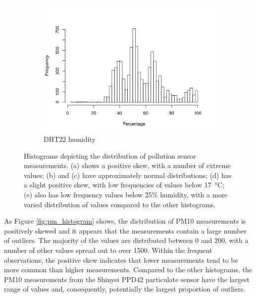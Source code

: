\documentclass[11pt]{report}
\begin{document}
\begin{figure}[!tbp]
\begin{minipage}{1\linewidth}
\begin{subfigure}[t]{.5\linewidth}
            	\label{fig:temp_histogram}
	   \end{subfigure}
        \end{minipage}
    \begin{minipage}{1\linewidth}
    	\centering
        \begin{subfigure}[t]{.5\linewidth}
            \includegraphics[width=\textwidth]{images/humidity_histogram}
            \caption{DHT22 humidity}
            \label{fig:humidity_histogram}
        \end{subfigure}
    \end{minipage}
    \caption[Sensor measurement histograms.]{Histograms depicting the distribution of pollution sensor measurements. (a) shows a positive skew, with a number of extreme values; (b) and (c) have approximately normal distributions; (d) has a slight positive skew, with low frequencies of values below \SI{17}{\celsius}; (e) also has low frequency values below 25\% humidity, with a more varied distribution of values compared to the other histograms.}
\end{figure}

As Figure \ref{fig:pm_histogram} shows, the distribution of PM10 measurements is positively skewed and it appears that the measurements contain a large number of outliers. The majority of the values are distributed between 0 and 200, with a number of other values spread out to over \num{1500}. Within the frequent observations, the positive skew indicates that lower measurements tend to be more common than higher measurements. Compared to the other histograms, the PM10 measurements from the Shinyei PPD42 particulate sensor have the largest range of values and, consequently, potentially the largest proportion of outliers.
\end{document}
